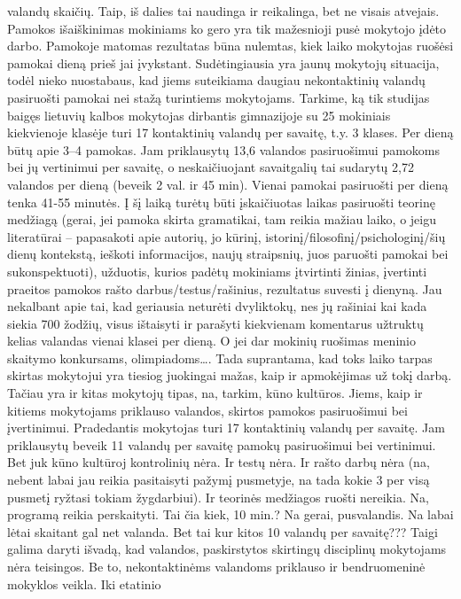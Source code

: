 \documentclass[]{article}
\begin{document}
valandų skaičių. Taip, iš dalies tai naudinga ir reikalinga, bet ne
visais atvejais. Pamokos išaiškinimas mokiniams ko gero yra tik
mažesnioji pusė mokytojo įdėto darbo. Pamokoje matomas rezultatas būna
nulemtas, kiek laiko mokytojas ruošėsi pamokai dieną prieš jai
įvykstant. Sudėtingiausia yra jaunų mokytojų situacija, todėl nieko
nuostabaus, kad jiems suteikiama daugiau nekontaktinių valandų
pasiruošti pamokai nei stažą turintiems mokytojams. Tarkime, ką tik
studijas baigęs lietuvių kalbos mokytojas dirbantis gimnazijoje su 25
mokiniais kiekvienoje klasėje turi 17 kontaktinių valandų per savaitę,
t.y. 3 klases. Per dieną būtų apie 3--4 pamokas. Jam priklausytų 13,6
valandos pasiruošimui pamokoms bei jų vertinimui per savaitę, o
neskaičiuojant savaitgalių tai sudarytų 2,72 valandos per dieną (beveik
2 val. ir 45 min). Vienai pamokai pasiruošti per dieną tenka 41-55
minutės. Į šį laiką turėtų būti įskaičiuotas laikas pasiruošti teorinę
medžiagą (gerai, jei pamoka skirta gramatikai, tam reikia mažiau laiko,
o jeigu literatūrai -- papasakoti apie autorių, jo kūrinį,
istorinį/filosofinį/psichologinį/šių dienų kontekstą, ieškoti
informacijos, naujų straipsnių, juos paruošti pamokai bei
sukonspektuoti), užduotis, kurios padėtų mokiniams įtvirtinti žinias,
įvertinti praeitos pamokos rašto darbus/testus/rašinius, rezultatus
suvesti į dienyną. Jau nekalbant apie tai, kad geriausia neturėti
dvyliktokų, nes jų rašiniai kai kada siekia 700 žodžių, visus ištaisyti
ir parašyti kiekvienam komentarus užtruktų kelias valandas vienai klasei
per dieną. O jei dar mokinių ruošimas meninio skaitymo konkursams,
olimpiadoms\ldots{}. Tada suprantama, kad toks laiko tarpas skirtas
mokytojui yra tiesiog juokingai mažas, kaip ir apmokėjimas už tokį
darbą. Tačiau yra ir kitas mokytojų tipas, na, tarkim, kūno kultūros.
Jiems, kaip ir kitiems mokytojams priklauso valandos, skirtos pamokos
pasiruošimui bei įvertinimui. Pradedantis mokytojas turi 17 kontaktinių
valandų per savaitę. Jam priklausytų beveik 11 valandų per savaitę
pamokų pasiruošimui bei vertinimui. Bet juk kūno kultūroj kontrolinių
nėra. Ir testų nėra. Ir rašto darbų nėra (na, nebent labai jau reikia
pasitaisyti pažymį pusmetyje, na tada kokie 3 per visą pusmetį ryžtasi
tokiam žygdarbiui). Ir teorinės medžiagos ruošti nereikia. Na, programą
reikia perskaityti. Tai čia kiek, 10 min.? Na gerai, pusvalandis. Na
labai lėtai skaitant gal net valanda. Bet tai kur kitos 10 valandų per
savaitę??? Taigi galima daryti išvadą, kad valandos, paskirstytos
skirtingų disciplinų mokytojams nėra teisingos. Be to, nekontaktinėms
valandoms priklauso ir bendruomeninė mokyklos veikla. Iki etatinio
\end{document}

